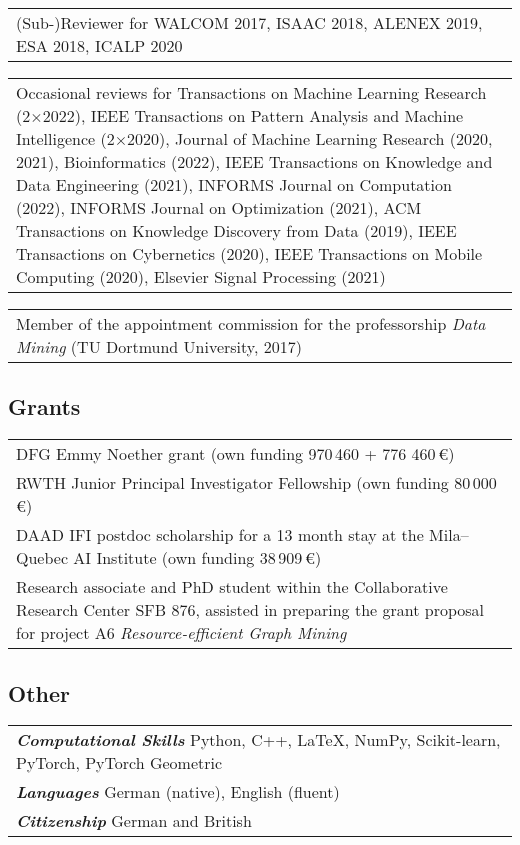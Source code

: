 \documentclass[11pt, a4paper, DIV=12]{scrartcl}
\begin{document}
\begin{tabular}{p{14.5cm}}
(Sub-)Reviewer for WALCOM 2017, ISAAC 2018, ALENEX 2019, ESA 2018, ICALP 2020 \\[0.5em]
\end{tabular}

\begin{tabular}{p{14.5cm}}
Occasional reviews for Transactions on Machine Learning Research (2$\times$2022), IEEE Transactions on Pattern Analysis and Machine Intelligence (2$\times$2020), Journal of Machine Learning Research (2020, 2021), Bioinformatics (2022), IEEE Transactions on Knowledge and Data Engineering (2021), INFORMS Journal on Computation (2022), INFORMS Journal on Optimization (2021), ACM Transactions on Knowledge Discovery from Data (2019), IEEE Transactions on Cybernetics (2020), IEEE Transactions on Mobile Computing (2020), Elsevier Signal Processing (2021)\\[0.5em]
\end{tabular}

\begin{tabular}{p{14.5cm}}
Member of the appointment commission for the professorship \emph{Data Mining} (TU Dortmund University, 2017)
\end{tabular}

\subsection*{Grants}
\begin{tabular}{p{14.5cm}}
	DFG Emmy Noether grant (own funding 970\,460 + 776 460\,€)\\[0.5em]
	
	RWTH Junior Principal Investigator Fellowship (own funding 80\,000 €)\\[0.5em]

	DAAD IFI postdoc scholarship for a 13 month stay at the Mila--Quebec AI Institute (own funding 38\,909\,€)\\[0.5em]
		
	Research associate and PhD student  within the Collaborative Research Center SFB 876, assisted in preparing the  grant proposal for project A6 \emph{Resource-efficient Graph Mining}
\end{tabular}


\subsection*{Other}

\begin{tabular}{l}
	\textsf{\textbf{\em Computational Skills}} Python, C\hspace{-1pt}+\hspace{-1pt}+, \LaTeX, NumPy, Scikit-learn, PyTorch, PyTorch Geometric\\
	\textsf{\textbf{\em Languages}} German (native), English (fluent)\\
	\textsf{\textbf{\em Citizenship}} German and British
\end{tabular}
\end{document}
